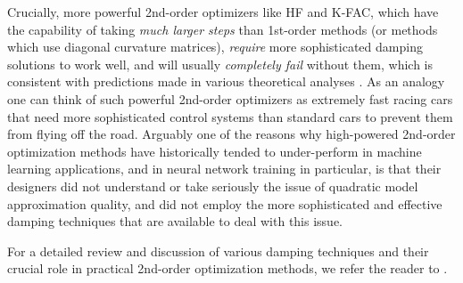 \documentclass[12pt]{article}
\newcommand{\acronym}{K-FAC}
\begin{document}
Crucially, more powerful 2nd-order optimizers like HF and \acronym{}, which have the capability of taking \emph{much larger steps} than 1st-order methods (or methods which use diagonal curvature matrices), \emph{require} more sophisticated damping solutions to work well, and will usually \emph{completely fail} without them, which is consistent with predictions made in various theoretical analyses \citep[e.g.][]{nocedal_book}.  As an analogy one can think of such powerful 2nd-order optimizers as extremely fast racing cars that need more sophisticated control systems than standard cars to prevent them from flying off the road.  Arguably one of the reasons why high-powered 2nd-order optimization methods have historically tended to under-perform in machine learning applications, and in neural network training in particular, is that their designers did not understand or take seriously the issue of quadratic model approximation quality, and did not employ the more sophisticated and effective damping techniques that are available to deal with this issue. 

For a detailed review and discussion of various damping techniques and their crucial role in practical 2nd-order optimization methods, we refer the reader to \citet{HF_chapter}.





\end{document}
